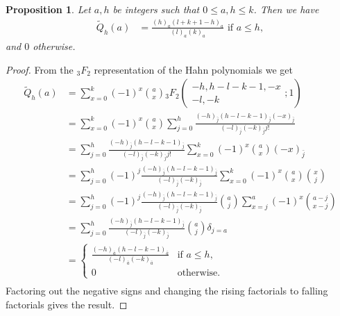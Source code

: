 \documentclass[11pt, a4paper, oneside, reqno]{amsart}
\newtheorem{proposition}[theorem]{Proposition}
\theoremstyle{remark}
\theoremstyle{definition}
\numberwithin{equation}{section}
\begin{document}
\begin{proposition}\label{prop:binomialtransform} 
Let $a,h$ be integers such that $0 \leq a,h \leq k$. Then we have
	\begin{align}
		\tilde{Q}_h(a) & = \frac{(h)_a(l+k+1-h)_a}{(l)_a(k)_a} \text{ if } a \leq h,
	\end{align}
	and $0$ otherwise.
\end{proposition}
\begin{proof}
	From the $_3F_2$ representation of the Hahn polynomials we get
	\begin{align*}
		\tilde{Q}_h(a) & =\sum_{x=0}^k(-1)^{x}\binom{a}{x}{}_3F_2(\begin{matrix}-h, h-l-k-1, -x \\ -l, -k\end{matrix}; 1) \\
		               & =\sum_{x=0}^k(-1)^{x}\binom{a}{x} \sum_{j=0}^h \frac{(-h)_{\bar{j}}(h-l-k-1)_{\bar{j}}(-x)_{\bar{j}}}{(-l)_{\bar{j}}(-k)_{\bar{j}} j!}                      \\
		               & =\sum_{j=0}^h \frac{(-h)_{\bar{j}}(h-l-k-1)_{\bar{j}}}{(-l)_{\bar{j}}(-k)_{\bar{j}} j!} \sum_{x=0}^k(-1)^{x}\binom{a}{x}(-x)_{\bar{j}}                      \\
		               & =\sum_{j=0}^h (-1)^j\frac{(-h)_{\bar{j}}(h-l-k-1)_{\bar{j}}}{(-l)_{\bar{j}}(-k)_{\bar{j}}} \sum_{x=0}^k(-1)^{x}\binom{a}{x}\binom{x}{j}             \\
		               & = \sum_{j=0}^h (-1)^j\frac{(-h)_{\bar{j}}(h-l-k-1)_{\bar{j}}}{(-l)_{\bar{j}}(-k)_{\bar{j}}} \binom{a}{j}\sum_{x=j}^a(-1)^x\binom{a-j}{x-j}          \\
		               & = \sum_{j=0}^h \frac{(-h)_{\bar{j}}(h-l-k-1)_{\bar{j}}}{(-l)_{\bar{j}}(-k)_{\bar{j}}} \binom{a}{j}\delta_{j=a}                                      \\
		               & =\begin{cases}
			                  \frac{(-h)_{\bar{a}}(h-l-k-1)_{\bar{a}}}{(-l)_{\bar{a}}(-k)_{\bar{a}}} & \text{if } a \leq h, \\
			                  0                                      & \text{otherwise.}
		                  \end{cases}                                                      \\
	\end{align*}
Factoring out the negative signs and 
changing the rising factorials to falling factorials gives the result.
\end{proof}
\end{document}
